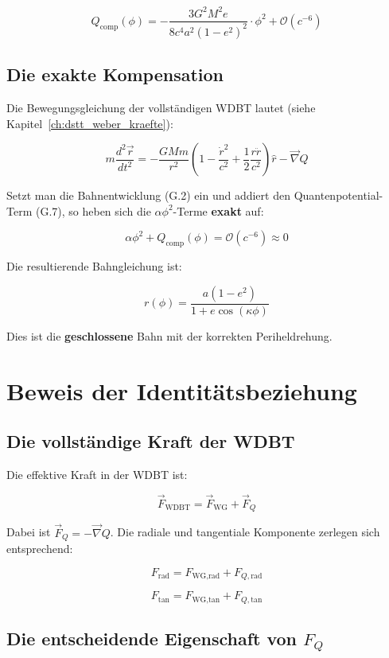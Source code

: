\[
Q_{\text{comp}}(\phi) = -\frac{3G^2M^2 e}{8c^4 a^2(1-e^2)^2} \cdot \phi^2 + \mathcal{O}(c^{-6})
\tag{G.7}
\]

\subsection{Die exakte Kompensation}
\label{sub:identitaet_exakte_kompensation}

Die Bewegungsgleichung der vollständigen WDBT lautet (siehe Kapitel~\ref{ch:dstt_weber_kraefte}):

\[
m \frac{d^2\vec{r}}{dt^2} = -\frac{GMm}{r^2} \left( 1 - \frac{\dot{r}^2}{c^2} + \frac{1}{2}\frac{r\ddot{r}}{c^2} \right) \hat{r} - \vec{\nabla} Q
\tag{G.8}
\]

Setzt man die Bahnentwicklung (G.2) ein und addiert den 
Quantenpotential-Term (G.7), so heben sich die \(\alpha\phi^2\)-Terme 
\textbf{exakt} auf:

\[
\alpha\phi^2 + Q_{\text{comp}}(\phi) = \mathcal{O}(c^{-6}) \approx 0
\tag{G.9}
\]

Die resultierende Bahngleichung ist:

\[
r(\phi) = \frac{a(1 - e^2)}{1 + e \cos(\kappa\phi)}
\tag{G.10}
\]

Dies ist die \textbf{geschlossene} Bahn mit der korrekten Periheldrehung.

\section{Beweis der Identitätsbeziehung}
\label{app:identitaet_beweis}

\subsection{Die vollständige Kraft der WDBT}
\label{sub:identitaet_vollstaendige_kraft}

Die effektive Kraft in der WDBT ist:

\[
\vec{F}_{\text{WDBT}} = \vec{F}_{\text{WG}} + \vec{F}_Q
\tag{G.11}
\]

Dabei ist \(\vec{F}_Q = -\vec{\nabla} Q\). Die radiale und tangentiale 
Komponente zerlegen sich entsprechend:

\[
F_{\text{rad}} = F_{\text{WG,rad}} + F_{Q,\text{rad}}
\tag{G.12}
\]

\[
F_{\text{tan}} = F_{\text{WG,tan}} + F_{Q,\text{tan}}
\tag{G.13}
\]

\subsection{Die entscheidende Eigenschaft von \(F_Q\)}
\label{sub:identitaet_fq_eigenschaft}

